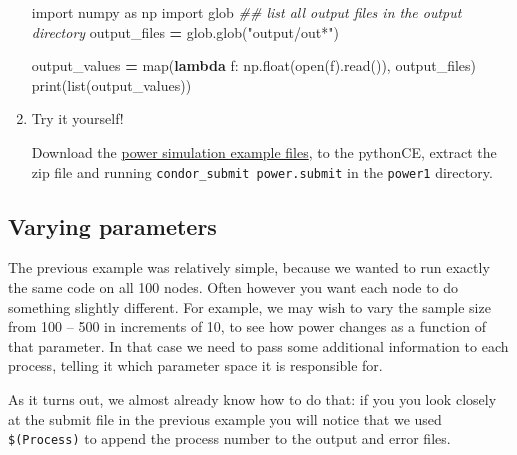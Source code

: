 \documentclass[]{book}
\newenvironment{Shaded}{\begin{snugshade}}{\end{snugshade}}
\newcommand{\KeywordTok}[1]{\textcolor[rgb]{0.13,0.29,0.53}{\textbf{#1}}}
\newcommand{\StringTok}[1]{\textcolor[rgb]{0.31,0.60,0.02}{#1}}
\newcommand{\ImportTok}[1]{#1}
\newcommand{\CommentTok}[1]{\textcolor[rgb]{0.56,0.35,0.01}{\textit{#1}}}
\newcommand{\OperatorTok}[1]{\textcolor[rgb]{0.81,0.36,0.00}{\textbf{#1}}}
\newcommand{\BuiltInTok}[1]{#1}
\newcommand{\NormalTok}[1]{#1}
\begin{document}
\begin{enumerate}
\begin{Shaded}
\begin{Highlighting}[]
\ImportTok{import}\NormalTok{ numpy }\ImportTok{as}\NormalTok{ np}
\ImportTok{import}\NormalTok{ glob}
\CommentTok{## list all output files in the output directory}
\NormalTok{output_files }\OperatorTok{=}\NormalTok{ glob.glob(}\StringTok{"output/out*"}\NormalTok{)}

\NormalTok{output_values }\OperatorTok{=} \BuiltInTok{map}\NormalTok{(}\KeywordTok{lambda}\NormalTok{ f: np.}\BuiltInTok{float}\NormalTok{(}\BuiltInTok{open}\NormalTok{(f).read()), output_files)}
\BuiltInTok{print}\NormalTok{(}\BuiltInTok{list}\NormalTok{(output_values))}
\end{Highlighting}
\end{Shaded}
\item
  Try it yourself!

  Download the \href{examples_Python/power1.zip}{power simulation
  example files}, to the pythonCE, extract the zip file and running
  \texttt{condor\_submit\ power.submit} in the \texttt{power1}
  directory.
\end{enumerate}

\subsection{Varying parameters}\label{varying-parameters-1}

The previous example was relatively simple, because we wanted to run
exactly the same code on all 100 nodes. Often however you want each node
to do something slightly different. For example, we may wish to vary the
sample size from 100 -- 500 in increments of 10, to see how power
changes as a function of that parameter. In that case we need to pass
some additional information to each process, telling it which parameter
space it is responsible for.

As it turns out, we almost already know how to do that: if you you look
closely at the submit file in the previous example you will notice that
we used \texttt{\$(Process)} to append the process number to the output
and error files.
\end{document}
